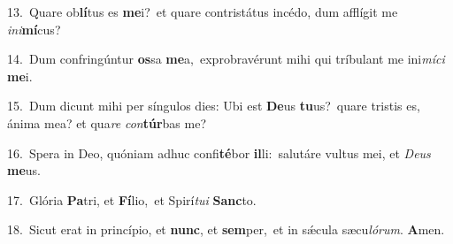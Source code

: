 {\numbfont\textcolor{\numbcolor}{13.}}~Quare ob\-\textbf{lí}\-tus es \textbf{me}\-i?~\star et quare contristátus incédo, dum afflígit me \textit{in}\-\textit{i}\textbf{mí}cus?\par
{\numbfont\textcolor{\numbcolor}{14.}}~Dum confringúntur \textbf{os}\-sa \textbf{me}\-a,~\star exprobravérunt mihi qui tríbulant me ini\-\textit{mí}\-\textit{ci} \textbf{me}\-i.\par
{\numbfont\textcolor{\numbcolor}{15.}}~Dum dicunt mihi per síngulos dies: Ubi est \textbf{De}\-us \textbf{tu}\-us?~\star quare tristis es, ánima mea? et qua\textit{re} \textit{con}\-\textbf{túr}bas me?\par
{\numbfont\textcolor{\numbcolor}{16.}}~Spera in Deo, quóniam adhuc confi\-\textbf{té}\-bor \textbf{il}\-li:~\star salutáre vultus mei, et \textit{De}\-\textit{us} \textbf{me}\-us.\par
{\numbfont\textcolor{\numbcolor}{17.}}~Glória \textbf{Pa}\-tri, et \textbf{Fí}\-lio,~\star et Spirí\-\textit{tu}\-\textit{i} \textbf{Sanc}\-to.\par
{\numbfont\textcolor{\numbcolor}{18.}}~Sicut erat in princípio, et \textbf{nunc}\-, et \textbf{sem}\-per,~\star et in sǽcula sæcu\-\textit{ló}\-\textit{rum}. \textbf{A}\-men.\par
